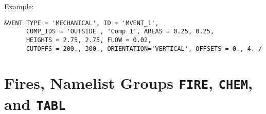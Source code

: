 
\noindent Example:
\begin{lstlisting}
&VENT TYPE = 'MECHANICAL', ID = 'MVENT_1',
      COMP_IDS = 'OUTSIDE', 'Comp 1', AREAS = 0.25, 0.25,
      HEIGHTS = 2.75, 2.75, FLOW = 0.02,
      CUTOFFS = 200., 300., ORIENTATION='VERTICAL', OFFSETS = 0., 4. /

\end{lstlisting}




\clearpage
\section{Fires, Namelist Groups \texorpdfstring{{\tt FIRE}}{FIRE}, \texorpdfstring{{\tt CHEM}}{CHEM},  and  \texorpdfstring{{\tt TABL}}{TABL}}
\label{info:FIRE3}

